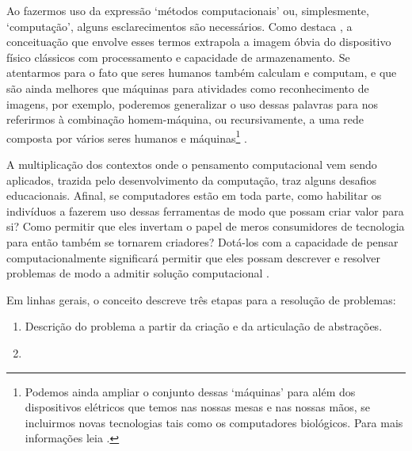 Ao fazermos uso da expressão `métodos computacionais' ou, simplesmente, `computação', alguns esclarecimentos são necessários. Como destaca , a conceituação que envolve esses termos extrapola a imagem óbvia do dispositivo físico clássicos com processamento e capacidade de armazenamento. Se atentarmos para o fato que seres humanos também calculam e computam, e que são ainda melhores que máquinas para atividades como reconhecimento de imagens, por exemplo, poderemos generalizar o uso dessas palavras para nos referirmos à combinação homem-máquina, ou recursivamente, a uma rede composta por vários seres humanos e máquinas\footnote{Podemos ainda ampliar o conjunto dessas `máquinas' para além dos dispositivos elétricos que temos nas nossas mesas e nas nossas mãos, se incluirmos novas tecnologias tais como os computadores biológicos. Para mais informações leia .} \cite{wing2008,Wing2010}.

A multiplicação dos contextos onde o pensamento computacional vem sendo aplicados, trazida pelo desenvolvimento da computação, traz alguns desafios educacionais. Afinal, se computadores estão em toda parte, como habilitar os indivíduos a fazerem uso dessas ferramentas de modo que possam criar valor para si? Como permitir que eles invertam o papel de meros consumidores de tecnologia para então também se tornarem criadores? Dotá-los com a capacidade de pensar computacionalmente significará permitir que eles possam descrever e resolver problemas de modo a admitir solução computacional \cite{Wing2010}. 










Em linhas gerais, o conceito descreve três etapas para a resolução de problemas:

\begin{enumerate}
  \item Descrição do problema a partir da criação e da articulação de abstrações.
  \item 

\end{enumerate}





